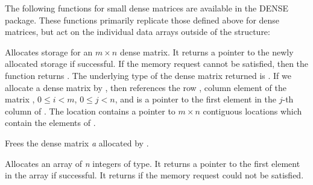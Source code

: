 \documentclass[letterpaper,10pt,english]{sphinxmanual}
\begin{document}
The following functions for small dense matrices are available in the
DENSE package.  These functions primarily replicate those defined above
for {\hyperref[linear_solvers/DLS:DlsMat]{}} dense matrices, but act on the individual data
arrays outside of the {\hyperref[linear_solvers/DLS:DlsMat]{}} structure:

\begin{fulllineitems}
\label{linear_solvers/DLS:newDenseMat}
Allocates storage for an $m \times n$ dense matrix. It
returns a pointer to the newly allocated storage if successful. If
the memory request cannot be satisfied, then the function returns
.  The underlying type of the dense matrix returned is
. If we allocate a dense matrix  by
, then  references the row ,
column  element of the matrix , $0 \le i < m$,
$0 \le j < n$, and  is a pointer to the first element
in the $j$-th column of . The location  contains
a pointer to $m \times n$ contiguous locations which contain
the elements of .

\end{fulllineitems}


\begin{fulllineitems}
\label{linear_solvers/DLS:destroyMat}
Frees the dense matrix \emph{a} allocated by {\hyperref[linear_solvers/DLS:newDenseMat]{}}.

\end{fulllineitems}


\begin{fulllineitems}
\label{linear_solvers/DLS:newLintArray}
Allocates an array of \emph{n} integers of  type.  It
returns a pointer to the first element in the array if
successful. It returns  if the memory request could not be
satisfied.

\end{fulllineitems}

\end{document}

